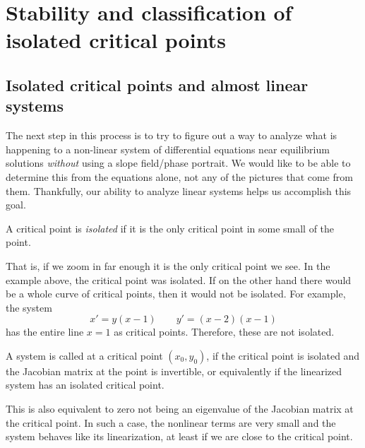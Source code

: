 \section{Stability and classification of isolated critical points}
\label{nlinstability:section}



\subsection{Isolated critical points and almost linear systems}
The next step in this process is to try to figure out a way to analyze what is happening to a non-linear system of differential equations near equilibrium solutions \emph{without} using a slope field/phase portrait. We would like to be able to determine this from the equations alone, not any of the pictures that come from them. Thankfully, our ability to analyze linear systems helps us accomplish this goal. 

\begin{definition}
A critical point is
\emph{isolated}
if it is the only critical point in some small
 of the point. 
\end{definition}
That is, if we zoom in far enough it is the
only critical point we see.  In the example above, the critical point was
isolated.  If on the other hand there would be a whole curve of critical
points, then it would not be isolated. For example, the system
\begin{equation*}
x' = y(x-1) \qquad y' = (x-2)(x-1)
\end{equation*}
has the entire line $x=1$ as critical points. Therefore, these are not isolated.

\begin{definition}
A system is called \emph{} at a critical point
$(x_0,y_0)$, if the critical point is isolated and the Jacobian matrix at the point
is invertible, or equivalently if the linearized system has an isolated
critical point.
\end{definition}
This is also equivalent to zero not being an eigenvalue of the Jacobian matrix at the critical point.
In such a case, the nonlinear terms are very small
and the system behaves like its linearization, at least if we are close
to the critical point.

